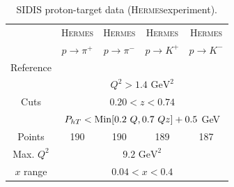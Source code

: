 \documentclass[aps,preprintnumbers,showpacs,nofootinbib,superscriptaddress,floatfix]{revtex4}
\newcommand{\hermes}{\textsc{Hermes}}
\newcommand{\Tperp}{T}
\begin{document}
\begin{table}[h!]
\begin{center}
\begin{tabular}{|c|c|c|c|c|}
 \hline
  & \hermes & \hermes & \hermes & \hermes \\
 ~          &  $p \to \pi^+$    &   $p \to \pi^-$    &  $p \to K^+$    &   $p \to K^-$               \\
 \hline
 Reference & \multicolumn{4}{c|}{\cite{Airapetian:2012ki}}        \\
\hline
\multirow{3}{*}{Cuts}             & \multicolumn{4}{c|}{$Q^2 > 1.4 \text{ GeV}^2$}     \\
             & \multicolumn{4}{c|}{$0.20 <z <0.74$}     \\
             & \multicolumn{4}{c|}{$P_{h \Tperp}< {\rm Min}[0.2\ Q, 0.7 \ Q z ] +0.5$ GeV}     \\
\hline
 Points         &  190 & 190 & 189 & 187       \\
 \hline
Max. $Q^2$      &  \multicolumn{4}{c|}{$9.2 \text{ GeV}^2 $}               \\
 \hline
$x$ range       & \multicolumn{4}{c|}{$0.04 < x < 0.4$ }                \\
\hline
\end{tabular}
\caption{SIDIS proton-target data (\hermes experiment).}
\label{t:data_SIDIS_proton}
\end{center}
\end{table}
\end{document}
